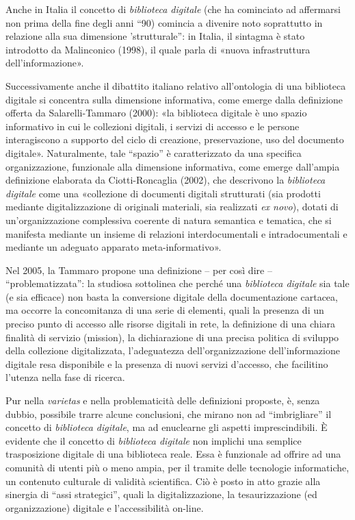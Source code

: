 \documentclass[
  b5paper,
  twoside,
  11pt,
  chapterprefix=false,
  bibliography=totocnumbered,
  parskip=0]{scrbook}
\begin{document}
Anche in Italia il concetto di \emph{biblioteca digitale} (che ha cominciato
ad affermarsi non prima della fine degli anni \enquote{90) comincia a divenire
noto soprattutto in relazione alla sua dimensione 'strutturale}: in
Italia, il sintagma è stato introdotto da Malinconico (1998), il quale
parla di «nuova infrastruttura dell'informazione».

Successivamente anche il dibattito italiano relativo all'ontologia di
una biblioteca digitale si concentra sulla dimensione informativa, come
emerge dalla definizione offerta da Salarelli-Tammaro (2000): «la
biblioteca digitale è uno spazio informativo in cui le collezioni
digitali, i servizi di accesso e le persone interagiscono a supporto del
ciclo di creazione, preservazione, uso del documento digitale».
Naturalmente, tale \enquote{spazio} è caratterizzato da una specifica
organizzazione, funzionale alla dimensione informativa, come emerge
dall'ampia definizione elaborata da Ciotti-Roncaglia (2002), che
descrivono la \emph{biblioteca digitale} come una «collezione di documenti
digitali strutturati (sia prodotti mediante digitalizzazione di
originali materiali, sia realizzati \emph{ex novo}), dotati di
un'organizzazione complessiva coerente di natura semantica e tematica,
che si manifesta mediante un insieme di relazioni interdocumentali e
intradocumentali e mediante un adeguato apparato meta-informativo».

Nel 2005, la Tammaro propone una definizione -- per così dire --
\enquote{problematizzata}: la studiosa sottolinea che perché una \emph{biblioteca
digitale} sia tale (e sia efficace) non basta la conversione digitale
della documentazione cartacea, ma occorre la concomitanza di una serie
di elementi, quali la presenza di un preciso punto di accesso alle
risorse digitali in rete, la definizione di una chiara finalità di
servizio (mission), la dichiarazione di una precisa politica di sviluppo
della collezione digitalizzata, l'adeguatezza dell'organizzazione
dell'informazione digitale resa disponibile e la presenza di nuovi
servizi d'accesso, che facilitino l'utenza nella fase di ricerca.

Pur nella \emph{varietas} e nella problematicità delle definizioni proposte,
è, senza dubbio, possibile trarre alcune conclusioni, che mirano non ad
\enquote{imbrigliare} il concetto di \emph{biblioteca digitale}, ma ad enuclearne gli
aspetti imprescindibili. È evidente che il concetto di \emph{biblioteca
digitale} non implichi una semplice trasposizione digitale di una
biblioteca reale. Essa è funzionale ad offrire ad una comunità di utenti
più o meno ampia, per il tramite delle tecnologie informatiche, un
contenuto culturale di validità scientifica. Ciò è posto in atto grazie
alla sinergia di \enquote{assi strategici}, quali la digitalizzazione, la
tesaurizzazione (ed organizzazione) digitale e l'accessibilità on-line.
\end{document}
